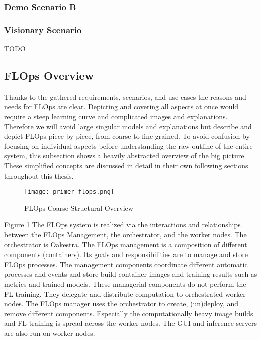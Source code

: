 \subsubsection{Demo Scenario B}

\subsubsection{Visionary Scenario}
TODO



\subsection{FLOps Overview}

Thanks to the gathered requirements, scenarios, and use cases the reasons and needs for FLOps are clear.
Depicting and covering all aspects at once would require a steep learning curve and complicated images and explanations.
Therefore we will avoid large singular models and explanations but describe and depict FLOps piece by piece, from coarse to fine grained.
To avoid confusion by focusing on individual aspects before understanding the raw outline of the entire system,
this subsection shows a heavily abstracted overview of the big picture.
These simplified concepts are discussed in detail in their own following sections throughout this thesis.

\begin{figure}[h]
    \centering
    \texttt{[image: primer\_flops.png]}
    \caption{FLOps Coarse Structural Overview}
    \label{fig:flops_structure_overview}
\end{figure}

Figure \ref{fig:flops_structure_overview}
The FLOps system is realized via the interactions and relationships between the FLOps Management, the orchestrator, and the worker nodes.
The orchestrator is Oakestra.
The FLOps management is a composition of different components (containers).
Its goals and responsibilities are to manage and store FLOps processes.
The management components coordinate different automatic processes and events and store build container images and training results such as metrics and trained models.
These managerial components do not perform the FL training.
They delegate and distribute computation to orchestrated worker nodes.
The FLOps manager uses the orchestrator to create, (un)deploy, and remove different components.
Especially the computationally heavy image builds and FL training is spread across the worker nodes.
The GUI and inference servers are also run on worker nodes.

